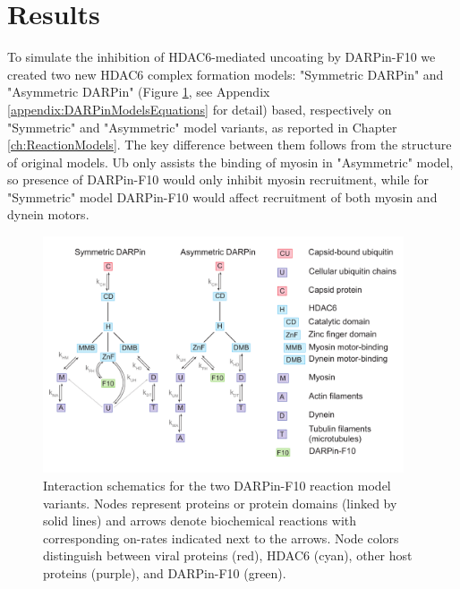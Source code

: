 \section{Results}

To simulate the inhibition of HDAC6-mediated uncoating by DARPin-F10 we created two new HDAC6 complex formation models: "Symmetric DARPin" and "Asymmetric DARPin" (Figure \ref{figure:darpinReactionModelSchemes}, see Appendix \ref{appendix:DARPinModelsEquations} for detail) based, respectively on "Symmetric" and "Asymmetric" model variants, as reported in Chapter \ref{ch:ReactionModels}. The key difference between them follows from the structure of original models. Ub only assists the binding of myosin in "Asymmetric" model, so presence of DARPin-F10 would only inhibit myosin recruitment, while for "Symmetric" model DARPin-F10 would affect recruitment of both myosin and dynein motors.

\begin{figure}
\begin{center}
\includegraphics[width=0.95\textwidth, trim={0cm 0cm 0cm 0cm}, clip]{D_chapters/3_DARPinModels/ReactionModelSchemesDarpin.pdf}
\caption[HDAC6 complex formation models densities with and without DARPin-F10]%
{Interaction schematics for the two DARPin-F10 reaction model variants. Nodes represent proteins or protein domains (linked by solid lines) and arrows denote biochemical reactions with corresponding on-rates indicated next to the arrows. Node colors distinguish between viral proteins (red), HDAC6 (cyan), other host proteins (purple), and DARPin-F10 (green).}
\label{figure:darpinReactionModelSchemes}
\end{center}
\end{figure}

